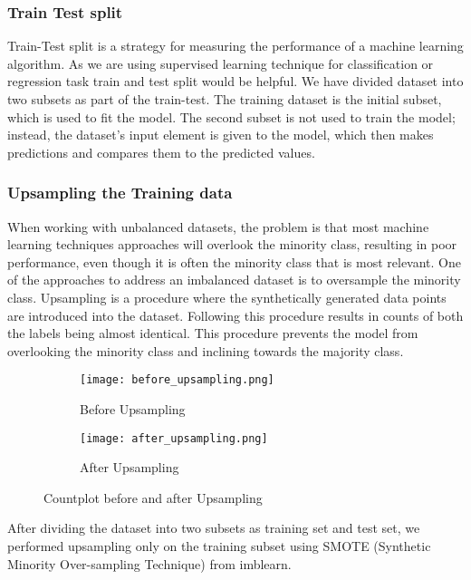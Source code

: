 \documentclass[12pt]{article}
\begin{document}
\subsubsection{Train Test split}
Train-Test split is a strategy for measuring the performance of a machine learning algorithm. As we are using supervised learning technique for classification or regression task train and test split would be helpful.
We have divided dataset into two subsets as part of the train-test. The training dataset is the initial subset, which is used to fit the model. The second subset is not used to train the model; instead, the dataset's input element is given to the model, which then makes predictions and compares them to the predicted values.

\subsubsection{Upsampling the Training data}
When working with unbalanced datasets, the problem is that most machine learning techniques approaches will overlook the minority class, resulting in poor performance, even though it is often the minority class that is most relevant. One of the approaches to address an imbalanced dataset is to oversample the minority class.
Upsampling is a procedure where the synthetically generated data points are introduced into the dataset. Following this procedure results in counts of both the labels being almost identical. This procedure prevents the model from overlooking the minority class and inclining towards the majority class.


\begin{figure}[!htb]
     \centering
     \begin{subfigure}[b]{0.3\textwidth}
         \centering
         \texttt{[image: before\_upsampling.png]}
         \caption{Before Upsampling}
         \label{fig:RF}
     \end{subfigure}
     \hfill
     \begin{subfigure}[b]{0.3\textwidth}
         \centering
         \texttt{[image: after\_upsampling.png]}
         \caption{After Upsampling}
         \label{fig:DT}
     \end{subfigure}
     \hfill
     \caption{Countplot before and after Upsampling}
\end{figure}

After dividing the dataset into two subsets as training set and test set, we performed upsampling only on the training subset using SMOTE (Synthetic Minority Over-sampling Technique) from imblearn.
\end{document}
